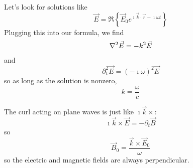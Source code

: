 \documentclass[a4paper,twoside,master.tex]{subfiles}
\begin{document}
Let's look for solutions like
\begin{equation}
    \vec{E} = \Re\left\{ \vec{E}_0 e^{\imath \vec{k} \cdot \vec{r} - \imath\omega t} \right\}
\end{equation}
Plugging this into our formula, we find
\begin{align}
    \laplacian{ \vec{E}} = -k^2 \vec{E}
\end{align}
and
\begin{equation}
    \partial_t^2 \vec{E} = (-\imath\omega)^2 \vec{E}
\end{equation}
so as long as the solution is nonzero,
\begin{equation}
    k = \frac{\omega}{c}
\end{equation}

The curl acting on plane waves is just like $ \imath \vec{k} \times $:
\begin{equation}
    \imath \vec{k} \times \vec{E} = -\partial_t \vec{B}
\end{equation}
so
\begin{equation}
    \vec{B}_0 = \frac{ \vec{k} \times \vec{E}_0}{\omega}
\end{equation}
so the electric and magnetic fields are always perpendicular.
\end{document}
